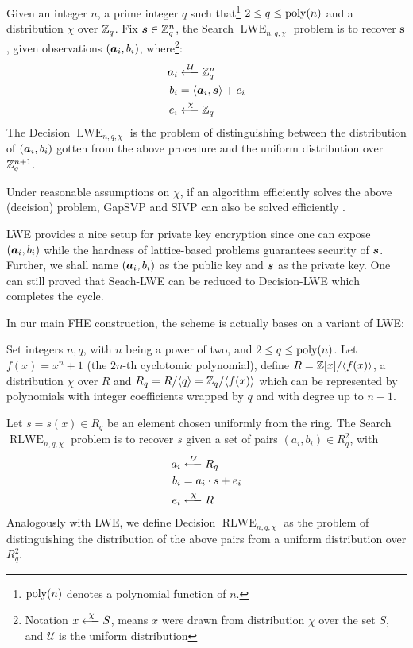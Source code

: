 \begin{definition} Given an integer $n$, a prime integer $q$ such that\footnote{$\operatorname{poly}(n)$ denotes a polynomial function of $n$.} $2\leq q\leq \operatorname{poly}(n)$ and a distribution $\chi$ over $\mathbb{Z}_q$. Fix $\boldsymbol{s}\in \mathbb{Z}_q^n$, the Search $\operatorname{LWE}_{n,q,\chi}$ problem is to recover $\boldsymbol s$, given observations $(\boldsymbol{a}_i,b_i)$, where\footnote{Notation $x\xlongleftarrow[]{\chi}S$, means $x$ were drawn from distribution $\chi$ over the set $S$, and $\mathcal{U}$ is the uniform distribution}:
\begin{align*}
    \bda_i&\xlongleftarrow[]{\mathcal U}\Z_q^n\\
    b_i &= \langle \bda_i,\bds\rangle + e_i\\
    e_i&\xlongleftarrow[]{\chi}\Z_q
\end{align*}
The Decision $\operatorname{LWE}_{n,q,\chi}$ is the problem of distinguishing between the distribution of $(\boldsymbol{a}_i,b_i)$ gotten from the above procedure and the uniform distribution over $\mathbb{Z}_q^{n+1}$.
\end{definition}
Under reasonable assumptions on $\chi$, if an algorithm efficiently solves the above (decision) problem, GapSVP and SIVP can also be solved efficiently \cite{regev09}. 

LWE provides a nice setup for private key encryption since one can expose $(\boldsymbol{a}_i,b_i)$ while the hardness of lattice-based problems guarantees security of $\boldsymbol{s}$. Further, we shall name $(\boldsymbol{a}_i,b_i)$ as the public key and $\boldsymbol{s}$ as the private key. One can still proved that Seach-LWE can be reduced to Decision-LWE \cite{lyubashevsky10} which completes the cycle.

In our main FHE construction, the scheme is actually bases on a variant of LWE:

\begin{definition}
 Set integers $n,q$, with $n$ being a power of two, and $2\leq q \leq \operatorname{poly}(n)$. Let $f(x)=x^n+1$ (the $2n$-th cyclotomic polynomial), define $R=\mathbb{Z}[x]/\langle f(x)\rangle$, a distribution $\chi$ over $R$ and $R_q=R/\langle q\rangle =\mathbb{Z}_q/\langle f(x)\rangle$ which can be represented by polynomials with integer coefficients wrapped by $q$ and with degree up to $n-1$.

Let $s=s(x)\in R_q$ be an element chosen uniformly from the ring. The Search $\operatorname{RLWE}_{n,q,\chi}$ problem is to recover $s$ given a set of pairs $(a_i,b_i)\in R_q^2$, with
\begin{align*}
    a_i&\xlongleftarrow[]{\mathcal U}R_q\\
    b_i &= a_i\cdot s + e_i\\
    e_i&\xlongleftarrow[]{\chi}R
\end{align*}
Analogously with LWE, we define Decision $\operatorname{RLWE}_{n,q,\chi}$ as the problem of distinguishing the distribution of the above pairs from a uniform distribution over $R_q^2$. 
\end{definition}

